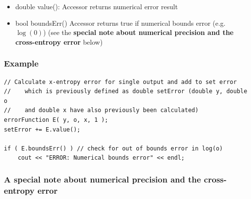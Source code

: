 \documentclass{report}
\begin{document}
\begin{itemize}
\begin{itemize}

\item $errorType = 0$ denotes the least mean squared error for $m$
output nodes 

\begin{displaymath}
E = \frac{1}{2} \sum_{i=1}^{m} (y_i - o_i)^2
\end{displaymath}

\item $errorType = 1$ denotes the cross-entropy error for $m$ output
nodes

\begin{displaymath}
E = \sum_{i=1}^{m} -y\log(o)-(1-y)\log(1-o)
\end{displaymath}

\end{itemize}

\item double value(): Accessor returns numerical error result

\item bool boundsErr() Accessor returns true if numerical bounds error
      (e.g. $\log(0)$) (see the {\bf special note about numerical
      precision and the cross-entropy error} below)

\end{itemize}

\subsubsection{Example}

\begin{verbatim}
// Calculate x-entropy error for single output and add to set error
//    which is previously defined as double setError (double y, double
o
//    and double x have also previously been calculated)
errorFunction E( y, o, x, 1 );
setError += E.value();

if ( E.boundsErr() ) // check for out of bounds error in log(o)
    cout << "ERROR: Numerical bounds error" << endl;
\end{verbatim}

\subsubsection{A special note about numerical precision and the
cross-entropy error}
\end{document}
